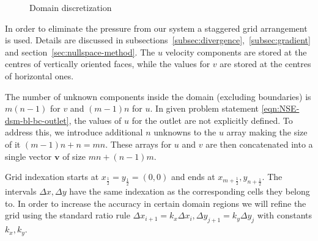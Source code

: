 \documentclass{article}
\begin{document}
\begin{figure}[H] %
  \caption{Domain discretization}\label{bl-domain-discretization}
\end{figure}

In order to eliminate the pressure from our system a staggered grid arrangement is used. Details are discussed in subsections~\ref{subsec:divergence},~\ref{subsec:gradient} and section~\ref{sec:nullspace-method}. The $u$ velocity components are stored at the centres of vertically oriented faces, while the values for $v$ are stored at the centres of horizontal ones. 

The number of unknown components inside the domain (excluding boundaries) is $m(n-1)$ for $v$ and $(m-1)n$ for $u$. In given problem statement \eqref{eqn:NSE-dsm-bl-bc-outlet}, the values of $u$ for the outlet are not explicitly defined. To address this, we introduce additional $n$ unknowns to the $u$ array making the size of it $(m-1)n+n=mn$. These arrays for $u$ and $v$ are then concatenated into a single vector $\boldsymbol{v}$ of size $mn+(n-1)m$.

Grid indexation starts at $x_{\frac{1}{2}}=y_{\frac{1}{2}}=(0,0)$ and ends at $x_{m+\frac{1}{2}},y_{n+\frac{1}{2}}$. The intervals $\Delta x, \Delta y$ have the same indexation as the corresponding cells they belong to. In order to increase the accuracy in certain domain regions we will refine the grid using the standard ratio rule $\Delta x_{i+1}=k_x\Delta x_i,\Delta y_{j+1}=k_y\Delta y_j$ with constants $k_x,k_y$.
\end{document}
